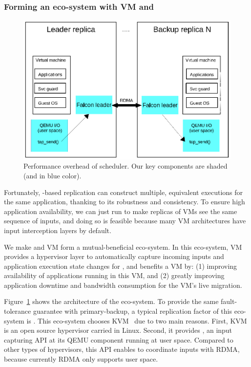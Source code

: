 \vspace{-.15in}\subsubsection{Forming an eco-system with VM and \falcon} 
\label{sec:vm-arch}\vspace{-.075in}

\begin{figure}[!htb]
\centering
\vspace{-.2in}
\includegraphics[width=0.34\textheight]{figures/vm_arch.ps}
        \vspace{-.3in}
        \caption{Performance overhead of scheduler. Our key components are 
shaded (and in blue color).}
        \label{fig:vm-arch}
\end{figure}

Fortunately, \paxos-based replication can construct multiple, equivalent 
executions for the same application, thanking to its robustness and 
consistency. To ensure high application availability, we can just run \paxos to 
make replicas of VMs see the same sequence of inputs, and doing so is feasible 
because many VM architectures have input interception layers by default.

We make \falcon and VM form a mutual-beneficial eco-system. In this eco-system, 
VM provides a hypervisor layer to automatically capture incoming inputs and 
application execution state changes for \falcon, and \falcon benefits a VM by: 
(1) improving availability of applications running in this VM, and (2) greatly 
improving application downtime and bandwidth consumption for the VM's live 
migration.

Figure~\ref{fig:vm-arch} shows the architecture of the eco-system. To provide 
the same fault-tolerance guarantee with primary-backup, a typical replication 
factor of this eco-system is . This eco-system chooses KVM~\cite{kvm} 
due to two main reasons. First, KVM is an open source hypervisor carried in 
Linux. Second, it provides , an input capturing API at its QEMU 
component running at user space. Compared to other types of hypervisors, this 
API enables \falcon to coordinate inputs with RDMA, because currently RDMA only 
supports user space.

